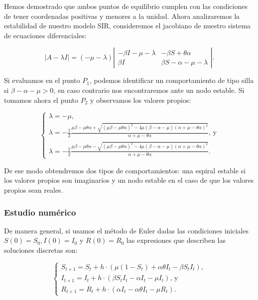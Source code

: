 Hemos demostrado que ambos puntos de equilibrio cumplen con las condiciones de tener coordenadas positivas y menores a la unidad. Ahora analizaremos la estabilidad de nuestro modelo SIR, consideremos el jacobiano de nuestro sistema de ecuaciones diferenciales:

$$|A-\lambda I|=(-\mu-\lambda)
\left|\begin{array}{cc}
-\beta I-\mu-\lambda & -\beta S+\theta\alpha\\
\beta I & \beta S-\alpha-\mu -\lambda
\end{array}\right|.$$

Si evaluamos en el punto $P_1$, podemos identificar un comportamiento de tipo silla si $\beta-\alpha-\mu>0$, en caso contrario nos encontraremos ante un nodo estable. Si tomamos ahora el punto $P_2$ y observamos los valores propios:

$$\left\{\begin{array}{l}
\lambda=-\mu,\\
\lambda=-\frac{1}{2}\frac{\mu\beta-\mu\theta\alpha+\sqrt{(\mu\beta-\mu\theta\alpha)^2-4\mu(\beta-\alpha-\mu)(\alpha+\mu-\theta\alpha)^2}}{\alpha+\mu-\theta\alpha} \text{, y}\\
\lambda=-\frac{1}{2}\frac{\mu\beta-\mu\theta\alpha-\sqrt{(\mu\beta-\mu\theta\alpha)^2-4\mu(\beta-\alpha-\mu)(\alpha+\mu-\theta\alpha)^2}}{\alpha+\mu-\theta\alpha}.
\end{array}\right.$$

De ese modo obtendremos dos tipos de comportamientos: una espiral estable si los valores propios son imaginarios y un nodo estable en el caso de que los valores propios sean reales.

\subsubsection{Estudio numérico}

De manera general, si usamos el método de Euler dadas las condiciones iniciales $S(0)=S_0,I(0)=I_0$ y $R(0)=R_0$ las expresiones que describen las soluciones discretas son:

$$\left\{\begin{array}{l}
S_{t+1} = S_t + h\cdot(\mu(1 - S_t) + \alpha\theta I_t - \beta S_t I_t), \\
I_{t+1} = I_t + h\cdot(\beta S_t I_t - \alpha I_t - \mu I_t)\text{, y} \\
R_{t+1} = R_t + h\cdot(\alpha I_t - \alpha\theta I_t - \mu R_t).
\end{array}\right.$$

